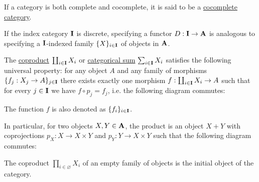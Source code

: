 \begin{definition}\label{def:cocomplete_category}
  If a category is both complete and cocomplete, it is said to be a \ul{cocomplete category}.
\end{definition}

\begin{definition}\label{def:categorical_coproduct}\cite[definition 5.2.2]{Leinster2014}
  If the index category $\operatorname{\mathbf{I}}$ is discrete, specifying a functor $D: \operatorname{\mathbf{I}} \to \operatorname{\mathbf{A}}$ is analogous to specifying a $\operatorname{\mathbf{I}}$-indexed family $\{ X \}_{i \in \operatorname{\mathbf{I}}}$ of objects in $\operatorname{\mathbf{A}}$.

  The \ul{coproduct} $\coprod_{i \in \operatorname{\mathbf{I}}} X_i$ or \ul{categorical sum} $\sum_{i \in \operatorname{\mathbf{I}}} X_i$ satisfies the following universal property: for any object $A$ and any family of morphisms $\{ f_j: {X_j} \to A \}_{j \in \operatorname{\mathbf{I}}}$ there exists exactly one morphism $f: \coprod_{i \in \operatorname{\mathbf{I}}} X_i \to A$ such that for every $j \in \operatorname{\mathbf{I}}$ we have $f \circ p_j = f_j$, i.e. the following diagram commutes:
  \begin{Center}
  \end{Center}

  The function $f$ is also denoted as $\{ f_i \}_{i \in \operatorname{\mathbf{I}}}$.

  In particular, for two objects $X, Y \in \operatorname{\mathbf{A}}$, the product is an object $X + Y$ with coprojections $p_X: X \to X \times Y$ and $p_Y: Y \to X \times Y$ such that the following diagram commutes:
  \begin{Center}
  \end{Center}
\end{definition}

\begin{note}\label{note:empty_categorical_coproduct}
  The coproduct $\prod_{i \in \varnothing} X_i$ of an empty family of objects is the initial object of the category.
\end{note}

